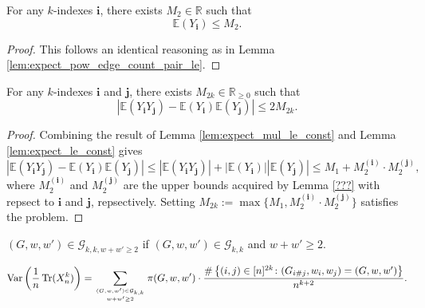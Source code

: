 \begin{lemma}
  \notready
  \label{lem:expect_le_const} 
  For any $k$-indexes $\mathbf{i}$, there exists $M_2 \in \mathbb{R}$ such that
  \[
  \mathbb{E} (Y_\mathbf{i}) \leq M_2.
  \]
\end{lemma}
\begin{proof}
  This follows an identical reasoning as in Lemma \ref{lem:expect_pow_edge_count_pair_le}.
\end{proof}
\begin{lemma}
  \notready
  \label{lem:abs_expect_mul_sub_mul_expect_le}
  For any $k$-indexes $\mathbf{i}$ and $\mathbf{j}$, there exists $M_{2k} \in \mathbb{R}_{\geq 0}$ such that
  \[
  | \mathbb{E} (Y_\mathbf{i}Y_\mathbf{j}) -  \mathbb{E}(Y_\mathbf{i}) \mathbb{E}(Y_\mathbf{j}) |
  \leq 2 M_{2k}.
  \] 
\end{lemma}
\begin{proof}
  Combining the result of Lemma \ref{lem:expect_mul_le_const} and Lemma \ref{lem:expect_le_const} gives
  \[
  | \mathbb{E} (Y_\mathbf{i}Y_\mathbf{j}) -  \mathbb{E}(Y_\mathbf{i}) \mathbb{E}(Y_\mathbf{j}) |
  \leq | \mathbb{E} (Y_\mathbf{i}Y_\mathbf{j}) | + | \mathbb{E}(Y_\mathbf{i})| | \mathbb{E}(Y_\mathbf{j}) |
  \leq M_1 + M_2^{(\mathbf{i})} \cdot M_2^{(\mathbf{j})},
  \]
  where $M_2^{(\mathbf{i})}$ and $M_2^{(\mathbf{j})}$ are the upper bounds acquired by Lemma \ref{???} with repsect to $\mathbf{i}$ and $\mathbf{j}$, repsectively. 
  Setting $M_{2k} := \max\{ M_1, M_2^{(\mathbf{i})} \cdot M_2^{(\mathbf{j})} \}$ satisfies the problem.
\end{proof}





\begin{definition}
  \notready
  \label{def:graph_walk_triple_set_w_ge_two}
  $(G,w,w')\in \mathcal{G}_{k,k,w+w'\ge 2}$ if $(G,w,w') \in \mathcal{G}_{k,k}$ and $w + w' \ge 2$.
\end{definition}


\begin{proposition}
  \label{prop:var_trace_as_sum}
  \notready
  \[ \operatorname{Var}\left( \frac1n\operatorname{Tr}(X_n^k)\right) = \sum_{(G,w,w')\in \mathcal{G}_{k,k}\atop w+w'\ge 2} \pi(G,w,w')\cdot\frac{\#\left\{(i,{j})\in [n]^{2k}\colon (G_{i\#j},w_{i},w_{j}) = (G,w,w')\right\}}{n^{k+2}}. \]
\end{proposition}

